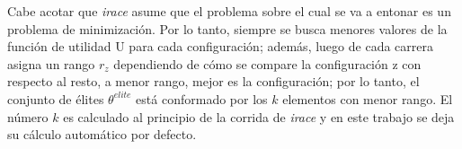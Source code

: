 
Cabe acotar que \emph{irace} asume que el problema sobre el cual se va a entonar es un problema de minimización. Por lo tanto, siempre se busca menores valores de la función de utilidad U para cada configuración; además, luego de cada carrera asigna un rango $r_z$ dependiendo de cómo se compare la configuración z con respecto al resto, a menor rango, mejor es la configuración; por lo tanto, el conjunto de élites $\theta^{elite}$ está conformado por los $k$ elementos con menor rango. El número $k$ es calculado al principio de la corrida de \emph{irace} y en este trabajo se deja su cálculo automático por defecto.




